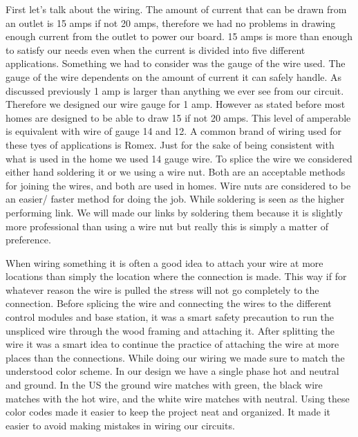First let{}'s talk about the wiring. The amount of current that can be drawn
from an outlet is 15 amps if not 20 amps, therefore we had no problems in
drawing enough current from the outlet to power our board. 15 amps is more than
enough to satisfy our needs even when the current is divided into five different
applications. Something we had to consider was the gauge of the wire used. The gauge
of the wire dependents on the amount of current it can safely handle. As
discussed previously 1 amp is larger than anything we ever see from our
circuit. Therefore we designed our wire gauge for 1 amp.
However as stated before most homes are designed to be able to draw 15 if not
20 amps. This level of amperable is equivalent with wire of gauge 14 and 12. A
common brand of wiring used for these tyes of applications is Romex. Just for
the sake of being consistent with what is used in the home we used 14
gauge wire. To splice the wire we considered either hand soldering it or we using a wire
nut. Both are an acceptable methods for joining the wires, and both are used in
homes. Wire nuts are considered to be an easier/ faster method for doing the
job. While soldering is seen as the higher performing
link. We will made our links by soldering them because it is slightly more
professional than using a wire nut but really this is simply a matter of
preference.

When wiring something it is often a good idea to attach your wire at more
locations than simply the location where the connection is made. This way if
for whatever reason the wire is pulled the stress will not go completely to the
connection. Before splicing the wire and connecting the wires to the different
control modules and base station, it was a smart safety precaution to run
the unspliced wire through the wood framing and attaching it. After splitting the
wire it was a smart idea to continue the practice of attaching the
wire at more places than the connections. While doing our wiring we made sure to match the understood color scheme. In our design we have a single phase hot and
neutral and ground. In the US the ground wire matches with green, the black
wire matches with the hot wire, and the white wire matches with neutral.
\cite{link14}
Using these color codes made it easier to keep the project neat and
organized. It made it easier to avoid making mistakes in wiring our circuits.

